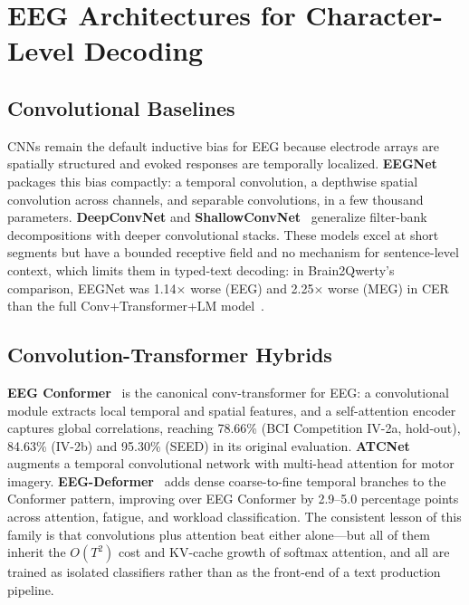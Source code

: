 \documentclass[conference]{IEEEtran}
\begin{document}
\section{EEG Architectures for Character-Level Decoding}

\subsection{Convolutional Baselines}
CNNs remain the default inductive bias for EEG because electrode arrays are
spatially structured and evoked responses are temporally localized.
\textbf{EEGNet}~\cite{lawhern2018eegnet} packages this bias compactly: a
temporal convolution, a depthwise spatial convolution across channels, and
separable convolutions, in a few thousand parameters.
\textbf{DeepConvNet} and \textbf{ShallowConvNet}~\cite{schirrmeister2017}
generalize filter-bank decompositions with deeper convolutional stacks.
These models excel at short segments but have a bounded receptive field and
no mechanism for sentence-level context, which limits them in typed-text
decoding: in Brain2Qwerty's comparison, EEGNet was 1.14$\times$ worse (EEG)
and 2.25$\times$ worse (MEG) in CER than the full Conv+Transformer+LM
model~\cite{levy2025}.

\subsection{Convolution-Transformer Hybrids}
\textbf{EEG Conformer}~\cite{song2023conformer} is the canonical
conv-transformer for EEG: a convolutional module extracts local temporal and
spatial features, and a self-attention encoder captures global correlations,
reaching 78.66\% (BCI Competition IV-2a, hold-out), 84.63\% (IV-2b) and
95.30\% (SEED) in its original evaluation. \textbf{ATCNet}~\cite{altaheri2023atcnet}
augments a temporal convolutional network with multi-head attention for
motor imagery. \textbf{EEG-Deformer}~\cite{ding2024deformer} adds dense
coarse-to-fine temporal branches to the Conformer pattern, improving over
EEG Conformer by 2.9--5.0 percentage points across attention, fatigue, and
workload classification. The consistent lesson of this family is that
convolutions plus attention beat either alone---but all of them inherit the
$O(T^2)$ cost and KV-cache growth of softmax attention, and all are trained
as isolated classifiers rather than as the front-end of a text production
pipeline.
\end{document}
